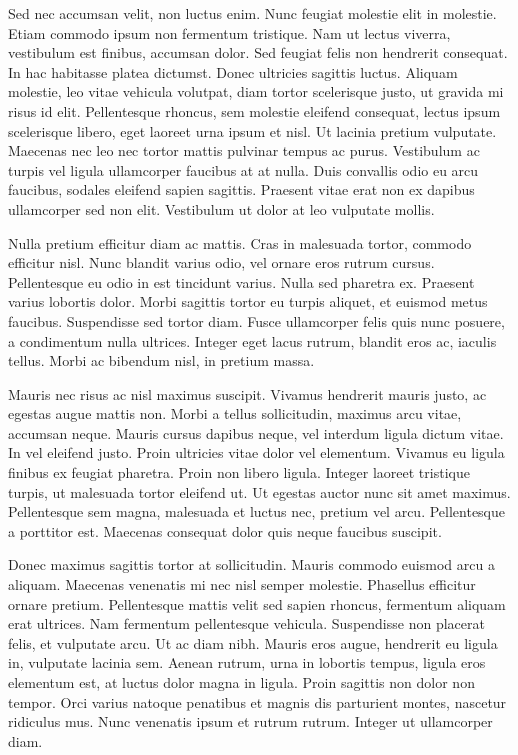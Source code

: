 \documentclass[a4paper,10pt,twoside]{article} %
\begin{document}
Sed nec accumsan velit, non luctus enim.
Nunc feugiat molestie elit in molestie.
Etiam commodo ipsum non fermentum tristique.
Nam ut lectus viverra, vestibulum est finibus, accumsan dolor.
Sed feugiat felis non hendrerit consequat.
In hac habitasse platea dictumst.
Donec ultricies sagittis luctus.
Aliquam molestie, leo vitae vehicula volutpat, diam tortor scelerisque justo, ut gravida mi risus id elit.
Pellentesque rhoncus, sem molestie eleifend consequat, lectus ipsum scelerisque libero, eget laoreet urna ipsum et nisl.
Ut lacinia pretium vulputate.
Maecenas nec leo nec tortor mattis pulvinar tempus ac purus.
Vestibulum ac turpis vel ligula ullamcorper faucibus at at nulla.
Duis convallis odio eu arcu faucibus, sodales eleifend sapien sagittis.
Praesent vitae erat non ex dapibus ullamcorper sed non elit.
Vestibulum ut dolor at leo vulputate mollis.

Nulla pretium efficitur diam ac mattis.
Cras in malesuada tortor, commodo efficitur nisl.
Nunc blandit varius odio, vel ornare eros rutrum cursus.
Pellentesque eu odio in est tincidunt varius.
Nulla sed pharetra ex.
Praesent varius lobortis dolor.
Morbi sagittis tortor eu turpis aliquet, et euismod metus faucibus.
Suspendisse sed tortor diam.
Fusce ullamcorper felis quis nunc posuere, a condimentum nulla ultrices.
Integer eget lacus rutrum, blandit eros ac, iaculis tellus.
Morbi ac bibendum nisl, in pretium massa.

Mauris nec risus ac nisl maximus suscipit.
Vivamus hendrerit mauris justo, ac egestas augue mattis non.
Morbi a tellus sollicitudin, maximus arcu vitae, accumsan neque.
Mauris cursus dapibus neque, vel interdum ligula dictum vitae.
In vel eleifend justo.
Proin ultricies vitae dolor vel elementum.
Vivamus eu ligula finibus ex feugiat pharetra.
Proin non libero ligula.
Integer laoreet tristique turpis, ut malesuada tortor eleifend ut.
Ut egestas auctor nunc sit amet maximus.
Pellentesque sem magna, malesuada et luctus nec, pretium vel arcu.
Pellentesque a porttitor est.
Maecenas consequat dolor quis neque faucibus suscipit.

Donec maximus sagittis tortor at sollicitudin.
Mauris commodo euismod arcu a aliquam.
Maecenas venenatis mi nec nisl semper molestie.
Phasellus efficitur ornare pretium.
Pellentesque mattis velit sed sapien rhoncus, fermentum aliquam erat ultrices.
Nam fermentum pellentesque vehicula.
Suspendisse non placerat felis, et vulputate arcu.
Ut ac diam nibh.
Mauris eros augue, hendrerit eu ligula in, vulputate lacinia sem.
Aenean rutrum, urna in lobortis tempus, ligula eros elementum est, at luctus dolor magna in ligula.
Proin sagittis non dolor non tempor.
Orci varius natoque penatibus et magnis dis parturient montes, nascetur ridiculus mus.
Nunc venenatis ipsum et rutrum rutrum.
Integer ut ullamcorper diam.
\end{document}
